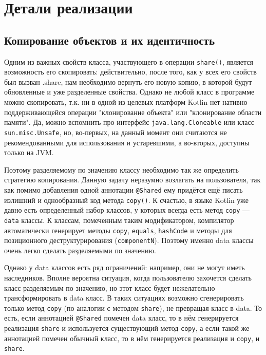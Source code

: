 \documentclass[specification,annotation,times]{itmo-student-thesis}
\newcommand{\todo}[1]{\textbf{TODO}} %
\begin{document}
\chapter{Детали реализации}



\section{Копирование объектов и их идентичность}\label{codegen}

Одним из важных свойств класса, участвующего в операции \texttt{share()}, является возможность его скопировать: действительно, после того, как у всех его свойств был вызван .share, нам необходимо вернуть его новую копию, в которой будут обновленные и уже разделенные свойства.
Однако не любой класс в программе можно скопировать, т.к. ни в одной из целевых платформ Kotlin нет нативно поддерживающейся операции "клонирование объекта" или "клонирование области памяти". Да, можно вспомнить про интерфейс \texttt{java.lang.Cloneable} или класс \texttt{sun.misc.Unsafe}, но, во-первых, на данный момент они считаются не рекомендованными для использования и устаревшими, а во-вторых, доступны только на JVM.

Поэтому разделяемому по значению классу необходимо так же определить стратегию копирования. Данную задачу неразумно возлагать на пользователя, так как помимо добавления одной аннотации \texttt{@Shared} ему придётся ещё писать излишний и однообразный код метода \texttt{copy()}.
К счастью, в языке Kotlin уже давно есть определенный набор классов, у которых всегда есть метод \texttt{copy} --- \texttt{data} классы. К классам, помеченным таким модификатором, компилятор автоматически генерирует методы \texttt{copy}, \texttt{equals}, \texttt{hashCode} и методы для позиционного деструктурирования (\texttt{componentN}).
Поэтому именно data классы очень легко сделать разделяемыми по значению.

Однако у data классов есть ряд ограничений: например, они не могут иметь наследников. Вполне вероятна ситуация, когда пользователю захочется сделать класс разделяемым по значению, но этот класс будет нежелательно трансформировать в data класс.
В таких ситуациях возможно сгенерировать только метод \texttt{copy} (по аналогии с методом \texttt{share}), не превращая класс в data. То есть, если аннотацией \texttt{@Shared} помечен data класс, то в нём генерируется реализация \texttt{share} и используется существующий метод \texttt{copy}, а если такой же аннотацией помечен обычный класс, то в нём генерируется реализация и \texttt{copy}, и \texttt{share}.
\end{document}
